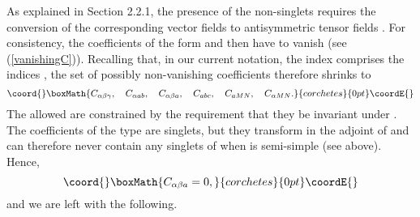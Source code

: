 \documentclass[a4paper,11pt]{article}
\begin{document}
As explained in Section 2.2.1, the presence of the non-singlets
\coordHE{} requires the conversion of the corresponding vector fields
\coordHE{} to antisymmetric tensor fields \coordHE{}. For
consistency, the coefficients of the form \coordHE{} and \coordHE{}
then have to vanish (see (\ref{vanishingC})).
Recalling that, in our current notation, the index \coordHE{} comprises
the indices \coordHE{}, the set of possibly non-vanishing
coefficients \coordHE{} therefore shrinks to
\begin{displaymath}\coord{}\boxMath{
C_{\alpha\beta\gamma}, \quad C_{\alpha ab}, \quad C_{\alpha \beta
a}, \quad C_{abc}, \quad C_{a MN}, \quad C_{\alpha MN}.
}{corchetes}{0pt}\coordE{}\end{displaymath}
The allowed \coordHE{} are constrained by the requirement that they
be invariant under \coordHE{}. The coefficients of the type \coordHE{}
are \coordHE{} singlets, but they transform in the adjoint of \coordHE{} and
can therefore never contain any singlets of \coordHE{} when \coordHE{} is
semi-simple (see above). Hence,
\begin{displaymath}\coord{}\boxMath{
C_{\alpha\beta a}=0,
}{corchetes}{0pt}\coordE{}\end{displaymath}
and we are left with the following.
\end{document}
